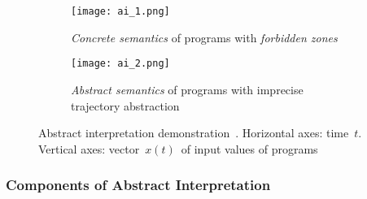\begin{figure}[hbt]
    \centering

    \begin{subfigure}[hbt]{.45 \linewidth}
        \centering
        \texttt{[image: ai\_1.png]}
        \caption{
            \emph{Concrete semantics} of programs with
            \emph{forbidden zones}
        }
        \label{fig:ai1}
    \end{subfigure}
%
    \hfill
%
    \begin{subfigure}[hbt]{.45\linewidth}
        \centering
        \texttt{[image: ai\_2.png]}
        \caption{
            \emph{Abstract semantics} of programs with imprecise
            trajectory abstraction
        }
        \label{fig:ai2}
    \end{subfigure}

    \caption{
        Abstract interpretation demonstration~\cite{AIInNutshellCousot}.
        Horizontal axes: time~$ t $. Vertical axes:
        vector~$ x(t) $~of input values of programs
    }
\end{figure}

\subsubsection*{Components of Abstract Interpretation}

